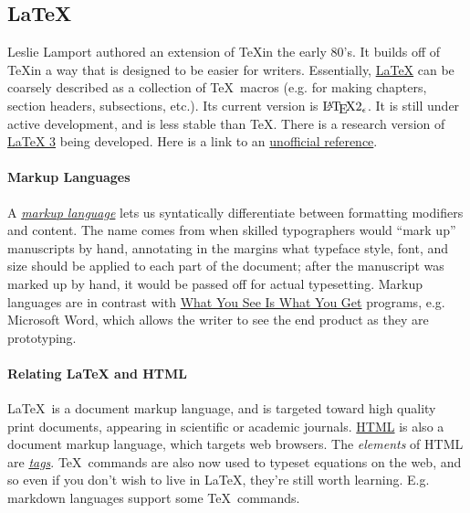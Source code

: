 \documentclass[12pt,letterpaper,twoside]{article}
\begin{document}
\subsection{\LaTeX} Leslie Lamport authored an extension of \TeX in
the early 80's. It builds off of \TeX in a way that is designed to be
easier for writers. Essentially,
\href{https://en.wikipedia.org/wiki/LaTeX}{\LaTeX}
can be coarsely described as a collection of \TeX \, macros
(e.g. for making chapters, section headers, subsections, etc.). Its
current version is $\textrm{\LaTeX} 2_{\epsilon}$. It is still under active
development, and is less stable than \TeX. There is a research version
of
\href{https://www.latex-project.org/help/documentation/ltx3info.pdf}{\LaTeX
  3}
being developed. Here is a link to an
\href{http://texdoc.net/texmf-dist/doc/latex/latex2e-help-texinfo/latex2e.pdf}{unofficial reference}.

\paragraph{Markup Languages}
A \href{https://en.wikipedia.org/wiki/Markup_language#Etymology}{\emph{markup
  language}} lets us syntatically differentiate between
formatting modifiers and content. The name comes from when skilled
typographers would ``mark up'' manuscripts by hand, annotating in the
margins what typeface style, font, and size should be applied to each
part of the document; after the manuscript was marked up by hand, it
would be passed off for actual typesetting. Markup languages are in
contrast with \href{https://en.wikipedia.org/wiki/WYSIWYG}{What
You See Is What You Get} programs, e.g. Microsoft Word, which allows
the writer to see the end product as they are prototyping.

\paragraph{Relating LaTeX and HTML}
\LaTeX \, is a document markup language, and is targeted toward high
quality print documents, appearing in scientific or academic journals.
\href{https://en.wikipedia.org/wiki/HTML}{HTML}
is also a document markup language, which targets web browsers. The
\emph{elements} of HTML are \href{https://en.wikipedia.org/wiki/HTML#Elements}{\emph{tags}}.
\TeX \, commands are also now used to typeset equations on the web, and
so even if you don't wish to live in \LaTeX, they're still worth
learning. E.g. markdown languages support some \TeX \, commands.
\end{document}
